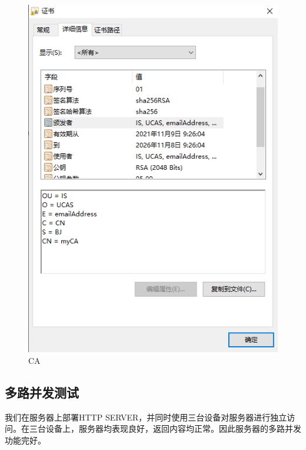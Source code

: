 \documentclass[a4paper]{article}
\begin{document}
\begin{figure}
\begin{center}
\includegraphics[scale=0.6]{figs/certificate2.PNG}
\end{center}
\caption{CA}
\label{ca}
\end{figure}

\subsection{多路并发测试}
我们在服务器上部署HTTP SERVER，并同时使用三台设备对服务器进行独立访问。在三台设备上，服务器均表现良好，返回内容均正常。因此服务器的多路并发功能完好。
\end{document}
